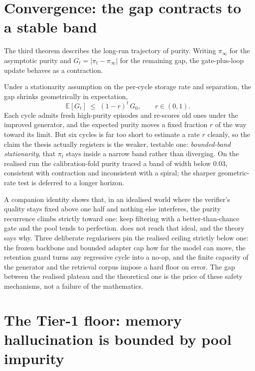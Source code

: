 \section{Convergence: the gap contracts to a stable band}
\label{sec:theory-convergence}

The third theorem describes the long-run trajectory of purity. Writing $\pi_\infty$ for
the asymptotic purity and $G_t = |\pi_t - \pi_\infty|$ for the remaining gap, the gate-plus-loop
update behaves as a contraction.

\begin{precise}
Under a stationarity assumption on the per-cycle storage rate and separation, the gap
shrinks geometrically in expectation,
\[
  \mathbb{E}[G_t] \;\le\; (1-r)^t\, G_0, \qquad r \in (0,1).
\]
Each cycle admits fresh high-purity episodes and re-scores old ones under the improved
generator, and the expected purity moves a fixed fraction $r$ of the way toward its limit.
But six cycles is far too short to estimate a rate $r$ cleanly, so the claim the thesis
actually registers is the weaker, testable one: \emph{bounded-band stationarity}, that
$\pi_t$ stays inside a narrow band rather than diverging. On the realised run the
calibration-fold purity traced a band of width below $0.03$, consistent with contraction
and inconsistent with a spiral; the sharper geometric-rate test is deferred to a longer
horizon.
\end{precise}

\begin{intuition}
A companion identity shows that, in an idealised world where the verifier's quality stays
fixed above one half and nothing else interferes, the purity recurrence climbs strictly
toward one: keep filtering with a better-than-chance gate and the pool tends to perfection.
\caem{} does not reach that ideal, and the theory says why. Three deliberate regularisers
pin the realised ceiling strictly below one: the frozen backbone and bounded adapter cap
how far the model can move, the retention guard turns any regressive cycle into a no-op, and
the finite capacity of the generator and the retrieval corpus impose a hard floor on error.
The gap between the realised plateau and the theoretical one is the price of these safety
mechanisms, not a failure of the mathematics.
\end{intuition}

\section{The Tier-1 floor: memory hallucination is bounded by pool impurity}
\label{sec:theory-tier1}

